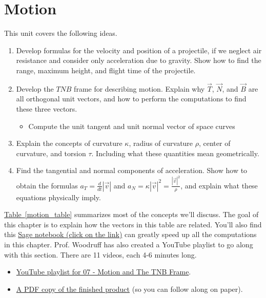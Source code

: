 \documentclass[10pt,]{book}
\theoremstyle{plain}
\theoremstyle{definition}
\theoremstyle{definition}
\theoremstyle{definition}
\theoremstyle{definition}
\theoremstyle{definition}
\numberwithin{equation}{section}
\newcommand{\sageurlforcurvature}{http://bmw.byuimath.com/dokuwiki/doku.php?id=curvature_calculator}
\begin{document}
\chapter[{Motion}]{Motion}\label{chapter-8}
This unit covers the following ideas. \leavevmode%
\begin{enumerate}
\item\hypertarget{li-90}{}Develop formulas for the velocity and position of a projectile, if we neglect air resistance and consider only acceleration due to gravity. Show how to find the range, maximum height, and flight time of the projectile.%
\item\hypertarget{li-91}{}Develop the \(TNB\) frame for describing motion. Explain why \(\vec T\), \(\vec N\), and \(\vec B\) are all orthogonal unit vectors, and how to perform the computations to find these three vectors. %
\begin{itemize}[label=\textbullet]
\item{}Compute the unit tangent and unit normal vector of space curves%
\end{itemize}
%
\item\hypertarget{li-93}{}Explain the concepts of curvature \(\kappa\), radius of curvature \(\rho\), center of curvature, and torsion \(\tau\). Including what these quantities mean geometrically.%
\item\hypertarget{li-94}{}Find the tangential and normal components of acceleration. Show how to obtain the formulas \(a_T=\frac{d}{dt}|\vec v|\) and \(a_N=\kappa |\vec v|^2=\frac{|\vec v|^2}{\rho}\), and explain what these equations physically imply.%
\end{enumerate}
%
\par
\hyperref[motion_table]{Table~\ref{motion_table}} summarizes most of the concepts we'll discuss. The goal of this chapter is to explain how the vectors in this table are related. You'll also find this \href{\\sageurlforcurvature}{Sage notebook (click on the link)} can greatly speed up all the computations in this chapter. Prof. Woodruff has also created a YouTube playlist to go along with this section. There are 11 videos, each 4-6 minutes long. \leavevmode%
\begin{itemize}[label=\textbullet]
\item{}\href{http://www.youtube.com/playlist?list=PL30EE81142B1ED1F0\&feature=plcp}{YouTube playlist for 07 - Motion and The TNB Frame}.%
\item{}\href{http://db.tt/FmEGk9p5}{A PDF copy of the finished product} (so you can follow along on paper).%
\end{itemize}
\end{document}
